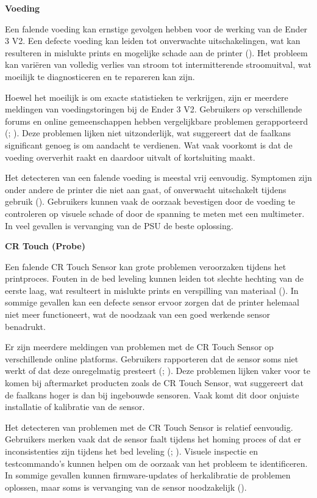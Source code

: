 \documentclass{article}
\begin{document}
\textbf{Voeding}

Een falende voeding kan ernstige gevolgen hebben voor de werking van de Ender 3 V2. Een defecte voeding kan leiden tot onverwachte uitschakelingen, wat kan resulteren in mislukte prints en mogelijke schade aan de printer (). Het probleem kan variëren van volledig verlies van stroom tot intermitterende stroomuitval, wat moeilijk te diagnosticeren en te repareren kan zijn.

Hoewel het moeilijk is om exacte statistieken te verkrijgen, zijn er meerdere meldingen van voedingstoringen bij de Ender 3 V2. Gebruikers op verschillende forums en online gemeenschappen hebben vergelijkbare problemen gerapporteerd (; ). Deze problemen lijken niet uitzonderlijk, wat suggereert dat de faalkans significant genoeg is om aandacht te verdienen. Wat vaak voorkomt is dat de voeding oververhit raakt en daardoor uitvalt of kortsluiting maakt. 

Het detecteren van een falende voeding is meestal vrij eenvoudig. Symptomen zijn onder andere de printer die niet aan gaat, of onverwacht uitschakelt tijdens gebruik (). Gebruikers kunnen vaak de oorzaak bevestigen door de voeding te controleren op visuele schade of door de spanning te meten met een multimeter. In veel gevallen is vervanging van de PSU de beste oplossing.

\textbf{CR Touch (Probe)}

Een falende CR Touch Sensor kan grote problemen veroorzaken tijdens het printproces. Fouten in de bed leveling kunnen leiden tot slechte hechting van de eerste laag, wat resulteert in mislukte prints en verspilling van materiaal (). In sommige gevallen kan een defecte sensor ervoor zorgen dat de printer helemaal niet meer functioneert, wat de noodzaak van een goed werkende sensor benadrukt.

Er zijn meerdere meldingen van problemen met de CR Touch Sensor op verschillende online platforms. Gebruikers rapporteren dat de sensor soms niet werkt of dat deze onregelmatig presteert (; ). Deze problemen lijken vaker voor te komen bij aftermarket producten zoals de CR Touch Sensor, wat suggereert dat de faalkans hoger is dan bij ingebouwde sensoren. Vaak komt dit door onjuiste installatie of kalibratie van de sensor.

Het detecteren van problemen met de CR Touch Sensor is relatief eenvoudig. Gebruikers merken vaak dat de sensor faalt tijdens het homing proces of dat er inconsistenties zijn tijdens het bed leveling (; ). Visuele inspectie en testcommando's kunnen helpen om de oorzaak van het probleem te identificeren. In sommige gevallen kunnen firmware-updates of herkalibratie de problemen oplossen, maar soms is vervanging van de sensor noodzakelijk ().
\end{document}
